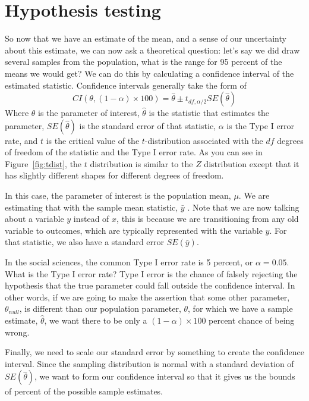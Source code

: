 \section{Hypothesis testing}
So now that we have an estimate of the mean, and a sense of our uncertainty about this estimate, we can now ask a theoretical question: let's say we did draw several samples from the population, what is the range for 95 percent of the means we would get? We can do this by calculating a confidence interval of the estimated statistic. Confidence intervals generally take the form of
\begin{equation}
CI\left(\theta,\left(1-\alpha\right)\times100\right)=\hat{\theta}\pm t_{df,\alpha/2}SE\left(\hat{\theta}\right)
\end{equation}
Where $\theta$ is the parameter of interest, $\hat{\theta}$ is the statistic that estimates the parameter, $SE\left(\hat{\theta}\right)$ is the standard error of that statistic, $\alpha$ is the Type I error rate, and $t$ is the critical value of the $t$-distribution associated with the $df$ degrees of freedom of the statistic and the Type I error rate. As you can see in Figure~\ref{fig:tdist}, the $t$ distribution is similar to the $Z$ distribution except that it has slightly different shapes for different degrees of freedom.

In this case, the parameter of interest is the population mean, $\mu$. We are estimating that with the sample mean statistic, $\bar{y}$ . Note that we are now talking about a variable $y$ instead of $x$, this is because we are transitioning from any old variable to outcomes, which are typically represented with the variable $y$. For that statistic, we also have a standard error $SE\left(\bar{y}\right)$.

In the social sciences, the common Type I error rate is 5 percent, or $\alpha = 0.05$. What is the Type I error rate? Type I error is the chance of falsely rejecting the hypothesis that the true parameter could fall outside the confidence interval. In other words, if we are going to make the assertion that some other parameter, $\theta_{null}$, is different than our population parameter, $\theta$, for which we have a sample estimate, $\hat{\theta}$, we want there to be only a $\left(1-\alpha\right)\times100$ percent chance of being wrong.

Finally, we need to scale our standard error by something to create the confidence interval. Since the sampling distribution is normal with a standard deviation of $SE\left(\hat{\theta}\right)$, we want to form our confidence interval so that it gives us the bounds of percent of the possible sample estimates.

